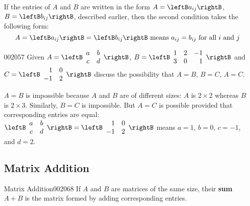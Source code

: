 \noindent If the entries of $A$ and $B$ are written in the form $A = \leftB a_{ij} \rightB$, $B = \leftB b_{ij} \rightB$, described earlier, then the second condition takes the following form:
\begin{equation*}
A = \leftB a_{ij} \rightB = \leftB b_{ij} \rightB \mbox{ means } a_{ij} = b_{ij} \mbox{ for all } i \mbox{ and } j
\end{equation*}
\begin{example}{}{002057}
Given $A = \leftB \begin{array}{cc}
a & b \\
c & d
\end{array}
\rightB$, $B = \leftB \begin{array}{rrr}
1 & 2 & -1 \\
3 & 0 & 1
\end{array}
\rightB$ and 
$C = \leftB \begin{array}{rr}
1 & 0 \\
-1 & 2
\end{array}
\rightB$
 discuss the possibility that $A = B$, $B = C$, $A = C$.


\begin{solution}
  $A = B$ is impossible because $A$ and $B$ are of different sizes: $A$ is $2 \times 2$ whereas $B$ is $2 \times 3$. Similarly, $B = C$ is impossible. But $A = C$ is possible provided that corresponding entries are equal: 
  $\leftB \begin{array}{cc}
  a & b \\
  c & d
  \end{array} \rightB =
  \leftB \begin{array}{rr}
  1 & 0 \\
  -1 & 2
  \end{array} \rightB$
 means $a = 1$, $b = 0$, $c = -1$, and $d = 2$.
\end{solution}
\end{example}

\subsection*{Matrix Addition}


\begin{definition}{Matrix Addition}{002068}
If $A$ and $B$ are matrices of the same size, their \textbf{sum} $A + B$ is the matrix formed by adding corresponding entries.
\end{definition}

